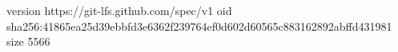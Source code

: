 version https://git-lfs.github.com/spec/v1
oid sha256:41865ea25d39ebbfd3e6362f239764ef0d602d60565c883162892abffd431981
size 5566

